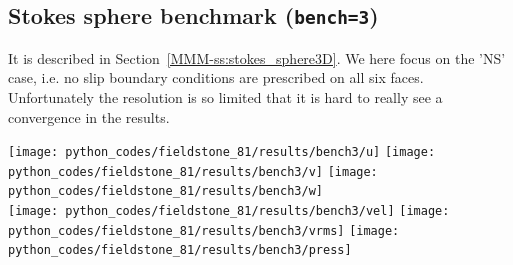 \subsection*{Stokes sphere benchmark ({\tt bench=3})}

It is described in Section~\ref{MMM-ss:stokes_sphere3D}. We here focus on the 'NS' case, i.e. no slip 
boundary conditions are prescribed on all six faces. Unfortunately the resolution is so limited 
that it is hard to really see a convergence in the results.

\begin{center}
\texttt{[image: python\_codes/fieldstone\_81/results/bench3/u]}
\texttt{[image: python\_codes/fieldstone\_81/results/bench3/v]}
\texttt{[image: python\_codes/fieldstone\_81/results/bench3/w]}\\
\texttt{[image: python\_codes/fieldstone\_81/results/bench3/vel]}
\texttt{[image: python\_codes/fieldstone\_81/results/bench3/vrms]}
\texttt{[image: python\_codes/fieldstone\_81/results/bench3/press]}
\end{center}


